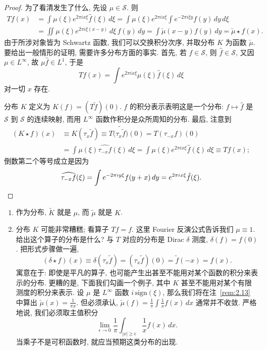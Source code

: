 \begin{proof}
为了看清发生了什么, 先设 $\mu\in\mathcal{S}$. 则
\begin{align*}
Tf(x)&=\int\mu(\xi)e^{2\pi ix\xi}\hat{f}(\xi)\,d\xi
=\int\mu(\xi)e^{2\pi ix\xi}\int e^{-2\pi i\xi y}f(y)\,dy\,d\xi \\
&=\iint\mu(\xi)e^{2\pi i\xi(x-y)}\,d\xi\, f(y)\,dy
=\int\check{\mu}(x-y)f(y)\,dy=\check{\mu}\star f(x).
\end{align*}
由于所涉对象皆为 Schwartz 函数, 我们可以交换积分次序, 并取分布 $K$ 为函数 $\check{\mu}$. 要给出一般情形的证明, 需要许多分布方面的事实. 首先, 若 $f\in\mathcal{S}$, 则 $\hat{f}\in\mathcal{S}$, 又因 $\mu\in L^\infty$, 故 $\mu\hat{f}\in L^1$, 于是
\[
Tf(x)=\int e^{2\pi ix\xi}\mu(\xi)\hat{f}(\xi)\,d\xi
\]
对一切 $x$ 存在.

分布 $K$ 定义为 $K(f)=(T\tilde{f})(0)$. $f$ 的积分表示表明这是一个分布: $f\mapsto\hat{f}$ 是 $\mathcal{S}$ 到 $\mathcal{S}$ 的连续映射, 而用 $L^\infty$ 函数作积分是众所周知的分布. 最后, 注意到
\begin{align*}
(K\star f)(x)&\equiv K(\tau_x\tilde{f})\equiv T\bigl(\widetilde{\tau_x\tilde{f}}\bigr)(0)
=T(\tau_{-x}f)(0) \\
&=\int\mu(\xi)\widehat{\tau_{-x}f}(\xi)\,d\xi
=\int\mu(\xi)e^{2\pi ix\xi}\hat{f}(\xi)\,d\xi\equiv Tf(x);
\end{align*}
倒数第二个等号成立是因为
\[
\widehat{\tau_{-x}f}(\xi)=\int e^{-2\pi iy\xi}f(y+x)\,dy=e^{2\pi ix\xi}\hat{f}(\xi). \qedhere
\]
\end{proof}

\begin{remark}\label{rem:1.3}
\begin{enumerate}[label=\alph*)]
\item 作为分布, $\tilde{K}$ 就是 $\mu$, 而 $\tilde{\mu}$ 就是 $K$.
\item 分布 $K$ 可能非常糟糕; 看算子 $Tf=f$. 这里 Fourier 反演公式告诉我们 $\mu\equiv 1$. 给出这个算子的分布是什么? 与 $T$ 对应的分布是 Dirac $\delta$ 测度, $\delta(f)=f(0)$. 把形式步骤做一遍,
\[
(\delta\star f)(x)\equiv\delta(\tau_x\tilde{f})=(\tau_x\tilde{f})(0)=\tilde{f}(-x)=f(x).
\]
寓意在于: 即使是平凡的算子, 也可能产生出甚至不能用对某个函数的积分来表示的分布. 更糟的是, 下面我们勾画一个例子, 其中 $K$ 甚至不能用对某个有限测度的积分来表示. 设 $\mu$ 是 $L^\infty$ 函数 $i\,\mathrm{sign}(\xi)$, 那么我们将在注~\ref{rem:2.13} 中算出 $\check{\mu}(x)=\frac{1}{\pi x}$. 但必须承认, $\check{\mu}(f)=\frac{1}{\pi}\int\frac{1}{x}f(x)\,dx$ 通常并不收敛. 严格地说, 我们必须取主值积分
\[
\lim_{\epsilon\to0}\frac{1}{\pi}\int_{|x|\geq\epsilon}\frac{1}{x}f(x)\,dx.
\]
当乘子不是可积函数时, 就应当预期这类分布的出现.
\end{enumerate}
\end{remark}

